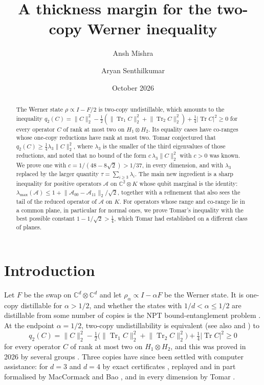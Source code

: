 \documentclass[11pt]{article}
\title{A thickness margin for the two-copy Werner inequality}
\author{Ansh Mishra \and Aryan Senthilkumar}
\date{October 2026}
\theoremstyle{remark}
\newcommand{\Tr}{\operatorname{Tr}}
\newcommand{\norm}[1]{\lVert #1\rVert}
\begin{document}
\maketitle

\begin{abstract}
The Werner state $\rho\propto I-F/2$ is two-copy undistillable, which amounts to the inequality
$q_2(C)=\norm{C}_2^2-\frac12(\norm{\Tr_1C}_2^2+\norm{\Tr_2C}_2^2)+\frac14|\Tr C|^2\ge0$ for every operator $C$ of rank
at most two on $H_1\otimes H_2$. Its equality cases have co-ranges whose one-copy reductions have rank at most two.
Tomar conjectured that $q_2(C)\ge\frac14\lambda_3\norm{C}_2^2$, where $\lambda_3$ is the smaller of the third eigenvalues
of those reductions, and noted that no bound of the form $c\,\lambda_3\norm{C}_2^2$ with $c>0$ was known. We prove one
with $c=1/(48-8\sqrt2)>1/37$, in every dimension, and with $\lambda_3$ replaced by the larger quantity
$\tau=\sum_{i\ge3}\lambda_i$. The main new ingredient is a sharp inequality for positive operators $\mathcal A$ on
$\mathbb C^2\otimes K$ whose qubit marginal is the identity:
$\lambda_{\max}(\mathcal A)\le1+\norm{\mathcal A_{00}-\mathcal A_{11}}_2/\sqrt2$, together with a refinement that also
sees the tail of the reduced operator of $\mathcal A$ on $K$. For operators whose range and co-range lie in a common
plane, in particular for normal ones, we prove Tomar's inequality with the best possible constant $1-1/\sqrt2>\frac14$,
which Tomar had established on a different class of planes.
\end{abstract}

\section{Introduction}

Let $F$ be the swap on $\mathbb C^d\otimes\mathbb C^d$ and let $\rho_\alpha\propto I-\alpha F$ be the Werner state. It is
one-copy distillable for $\alpha>1/2$, and whether the states with $1/d<\alpha\le1/2$ are distillable from some number of
copies is the NPT bound-entanglement problem \cite{DSSTT,DCLB,HRZ}. At the endpoint $\alpha=1/2$, two-copy
undistillability is equivalent \cite[Thm.~1]{CR23} (see also \cite[Thm.~V.1]{QGWG} and \cite[Thm.~1]{SongChen}) to
\begin{equation}\label{eq:q2}
q_2(C)=\norm{C}_2^2-\tfrac12\big(\norm{\Tr_1C}_2^2+\norm{\Tr_2C}_2^2\big)+\tfrac14|\Tr C|^2\ge0
\end{equation}
for every operator $C$ of rank at most two on $H_1\otimes H_2$, and this was proved in 2026 by several groups
\cite{FGP,SongChen,FHPV,BGH}. Three copies have since been settled with computer assistance: for $d=3$ and $d=4$ by exact certificates \cite{AnonD3,LiuD4}, replayed and in part formalised by MacCormack and Bao \cite{MB}, and in every dimension by Tomar \cite{Tomar}.
\end{document}
